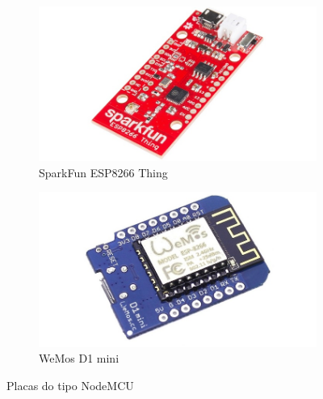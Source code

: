 \documentclass{beamer}
\begin{document}
\begin{frame}
\begin{minipage}{\textwidth}
\begin{figure}
			\begin{subfigure}[b]{0.25\textwidth}
				\includegraphics[width=\textwidth]{Sparkfun.jpg}
				\caption{SparkFun ESP8266 Thing}
				\label{fig:nofdfdde_mfsddfdcudfhfd}
			\end{subfigure}
			\begin{subfigure}[b]{0.25\textwidth}
				\includegraphics[width=\textwidth]{Wemos_D1_mini.jpg}
				\caption{WeMos D1 mini}
				\label{fig:nofdfdde_mfsddfdsfddcudfd}
			\end{subfigure}
			\caption{Placas do tipo NodeMCU}
			\label{fig:placddsfa_iot}
		\end{figure}
	\end{minipage}
\end{frame}
\end{document}
